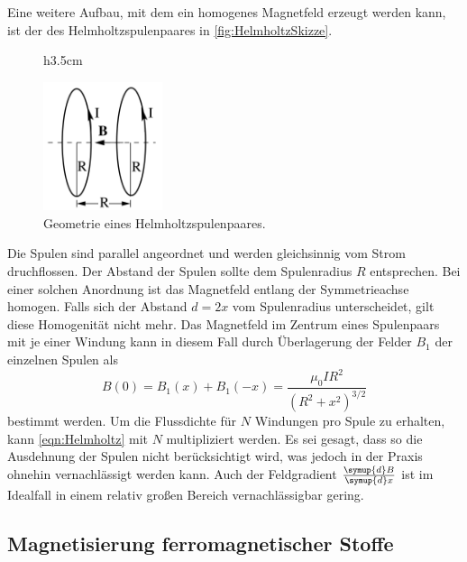 Eine weitere Aufbau, mit dem ein homogenes Magnetfeld erzeugt werden kann, ist der des Helmholtzspulenpaares in \autoref{fig:HelmholtzSkizze}.
\begin{figure}{h}{3.5cm}
    \centering
    \caption{Geometrie eines Helmholtzspulenpaares. \cite{v308}}
    \label{fig:HelmholtzSkizze}
    \includegraphics[width=3.5cm]{content/HelmholtzSkizze.jpg}
\end{figure}
Die Spulen sind parallel angeordnet und werden gleichsinnig vom Strom druchflossen. Der Abstand der Spulen sollte dem Spulenradius $R$ entsprechen. Bei einer solchen Anordnung 
ist das Magnetfeld entlang der Symmetrieachse homogen. Falls sich der Abstand $d = 2x$ vom Spulenradius unterscheidet, gilt diese Homogenität nicht mehr. Das Magnetfeld im 
Zentrum eines Spulenpaars mit je einer Windung kann in diesem Fall durch Überlagerung der Felder $B_1$ der einzelnen Spulen als
\begin{equation}
    \label{eqn:Helmholtz}
    B(0) = B_1(x) + B_1(-x) = \frac{\mu_0 I R^2}{(R^2 + x^2)^{3/2}}
\end{equation}
bestimmt werden. Um die Flussdichte für $N$ Windungen pro Spule zu erhalten, kann \autoref{eqn:Helmholtz} mit $N$ multipliziert werden. Es sei gesagt, dass so die Ausdehnung
der Spulen nicht berücksichtigt wird, was jedoch in der Praxis ohnehin vernachlässigt werden kann. %
Auch der Feldgradient $\frac{\symup{d}B}{\symup{d}x}$ ist im Idealfall in einem relativ großen Bereich vernachlässigbar gering.

\subsection{Magnetisierung ferromagnetischer Stoffe}
\label{subsec:Hysterese}
